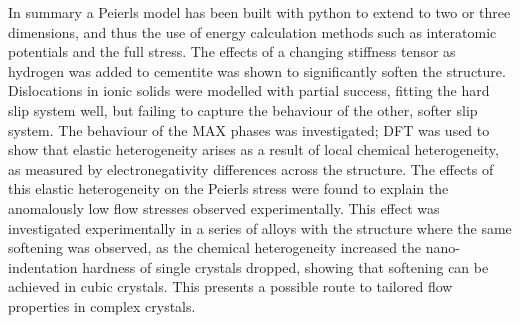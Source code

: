 In summary a Peierls model has been built with python to extend to two or three dimensions, and thus the use of energy calculation methods such as interatomic potentials and the full stress. The effects of a changing stiffness tensor as hydrogen was added to cementite was shown to significantly soften the structure. Dislocations in ionic solids were modelled with partial success, fitting the hard slip system well, but failing to capture the behaviour of the other, softer slip system. The behaviour of the MAX phases was investigated; DFT was used to show that elastic heterogeneity arises as a result of local chemical heterogeneity, as measured by electronegativity differences across the structure. The effects of this elastic heterogeneity on the Peierls stress were found to explain the anomalously low flow stresses observed experimentally. This effect was investigated experimentally in a series of alloys with the  structure where the same softening was observed, as the chemical heterogeneity  increased the nano-indentation hardness of single crystals dropped, showing that softening can be achieved in cubic crystals. This presents a possible route to tailored flow properties in complex crystals.

































































